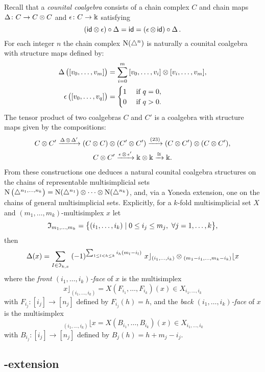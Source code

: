 Recall that a \textit{counital coalgebra} consists of a chain complex $C$ and chain maps $\copr \colon C \to C \ot C$ and $\aug \colon C \to \k$ satisfying
\[
(\id \ot \aug) \circ \copr =
\id =
(\aug \ot\, \id) \circ \copr.
\]
For each integer $n$ the chain complex $\chains(\simplex^n)$ is naturally a counital coalgebra with structure maps defined by:
\[
\begin{split}
	\copr \big( [v_0, \dots, v_m] \big) &=
	\sum_{i=0}^m \, [v_0, \dots, v_i] \ot [v_i, \dots, v_m], \\
	\aug \big( [v_0, \dots, v_q] \big) &=
	\begin{cases} 1 & \text{ if } q = 0, \\ 0 & \text{ if } q>0. \end{cases}
\end{split}
\]
The tensor product of two coalgebras $C$ and $C'$ is a coalgebra with structure maps given by the compositions:
\begin{gather*}
	C \ot C^\prime \xra{\copr \ot \copr^\prime}
	(C \ot C) \ot (C^\prime \ot C^\prime) \xra{(23)}
	(C \ot C^\prime) \ot (C \ot C^\prime), \\
	C \ot C^\prime \xra{\aug \ot \aug^\prime}
	\k \ot \k \xra{\cong} \k.
\end{gather*}
From these constructions one deduces a natural counital coalgebra structures on the chains of representable multisimplicial sets $\chains \big( \simplex^{n_1, \dots, n_k} \big) = \chains(\simplex^{n_1}) \ot \dotsb \ot \chains(\simplex^{n_k})$, and, via a Yoneda extension, one on the chains of general multisimplicial sets.
Explicitly, for a $k$-fold multisimplicial set $X$ and $(m_1,\dots,m_k)$-multisimplex $x$ let
\[
\fI_{m_1,\dots,m_k} = \set[\big]{(i_{1},\dots,i_{k}) \mid 0 \le i_j \le m_j,\ \forall j = 1,\dots,k},
\]
then
\[
\copr(x) =
\sum_{I\in \mathfrak{I}_{k,x}} \;
(-1)^{\sum_{1 \leq l<h \leq k} i_h (m_l-i_l) } \
x \rfloor_{(i_{1},\dots,i_{k})} \ot
\!\,_{(m_{1}-i_{1}, \dots, m_{k}-i_{k})} \lfloor x
\]
where the \textit{front $(i_1,\dots,i_k)$-face} of $x$ is the multisimplex
\[
x \rfloor_{(i_{1}, \dots, i_{k})} =
X(F_{i_1}, \dots, F_{i_k})(x) \in X_{i_1,\dots,i_k}
\]
with
$F_{i_j} \colon [i_j] \to [n_j]$ defined by $F_{i_j}(h)=h$, and the \textit{back $(i_1,\dots,i_k)$-face} of $x$ is the multisimplex
\[
\,_{(i_{1}, \dots, i_{k})} \lfloor x =
X(B_{i_1}, \dots, B_{i_k})(x) \in X_{i_1,\dots,i_k}
\]
with $B_{i_j} \colon [i_j] \to [n_j]$ defined by $B_j(h) = h+m_j-i_j$.

\subsection{\pdfEinfty-extension}

